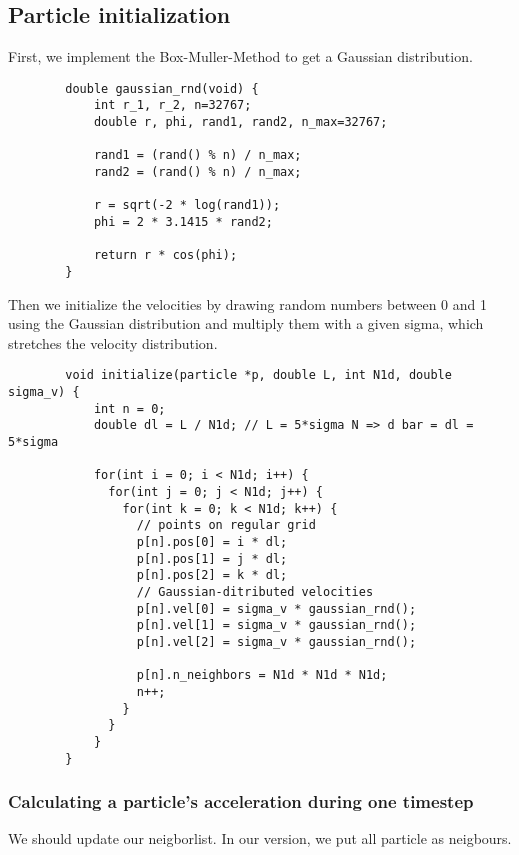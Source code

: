 \subsection{Particle initialization}
    First, we implement the Box-Muller-Method to get a Gaussian 
    distribution. \\
    \begin{lstlisting}
        double gaussian_rnd(void) {
            int r_1, r_2, n=32767;
            double r, phi, rand1, rand2, n_max=32767;

            rand1 = (rand() % n) / n_max;
            rand2 = (rand() % n) / n_max;

            r = sqrt(-2 * log(rand1));
            phi = 2 * 3.1415 * rand2;

            return r * cos(phi);
        }\end{lstlisting} 
    Then we initialize the velocities by drawing random numbers between 0 and 
    1 using the Gaussian distribution and multiply them with a given sigma,
    which stretches the velocity distribution. \\
    \begin{lstlisting}
        void initialize(particle *p, double L, int N1d, double sigma_v) {
            int n = 0;
            double dl = L / N1d; // L = 5*sigma N => d bar = dl = 5*sigma

            for(int i = 0; i < N1d; i++) {
              for(int j = 0; j < N1d; j++) {
                for(int k = 0; k < N1d; k++) {
                  // points on regular grid
                  p[n].pos[0] = i * dl;
                  p[n].pos[1] = j * dl;
                  p[n].pos[2] = k * dl;
                  // Gaussian-ditributed velocities
                  p[n].vel[0] = sigma_v * gaussian_rnd();
                  p[n].vel[1] = sigma_v * gaussian_rnd();
                  p[n].vel[2] = sigma_v * gaussian_rnd();

                  p[n].n_neighbors = N1d * N1d * N1d;
                  n++;
                }
              }
            }
        }\end{lstlisting}

\subsubsection{Calculating a particle's acceleration during one timestep}
    We should update our neigborlist. In our version, we put all particle as 
    neigbours.

